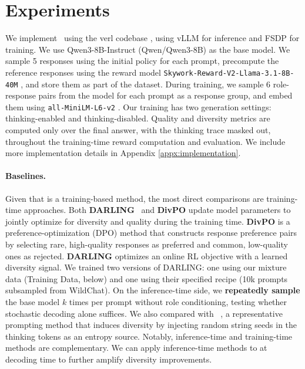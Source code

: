 

\section{Experiments}
\label{sec:experiments}
We implement \method~using the verl codebase \citep{sheng2024hybridflow}, using vLLM \citep{kwon2023efficient} for inference and FSDP \citep{zhao2023pytorch} for training. We use Qwen3-8B-Instruct (Qwen/Qwen3-8B) \citep{yang2025qwen3technicalreport} as the base model. We sample 5 responses using the initial policy for each prompt, precompute the reference responses using the reward model \texttt{Skywork-Reward-V2-Llama-3.1-8B-40M} \citep{liu2025skywork}, and store them as part of the dataset. During training, we sample 6 role-response pairs from the model for each prompt as a response group, and embed them using \texttt{all-MiniLM-L6-v2} \citep{wang2020minilmdeepselfattentiondistillation}. Our training has two generation settings: thinking-enabled and thinking-disabled. Quality and diversity metrics are computed only over the final answer, with the thinking trace masked out, throughout the training-time reward computation and evaluation. We include more implementation details in Appendix \ref{appx:implementation}.

\paragraph{Baselines.}
\label{subsec:baselines}
Given that \method{} is a training-based method, the most direct comparisons are training-time approaches. Both \textbf{DARLING}~\citep{li2025jointlyreinforcingdiversityquality} and \textbf{DivPO} \citep{lanchantin2025diverse} update model parameters to jointly optimize for diversity and quality during the training time. \textbf{DivPO} is a preference-optimization (DPO) method that constructs response preference pairs by selecting rare, high-quality responses as preferred and common, low-quality ones as rejected. \textbf{DARLING} optimizes an online RL objective with a learned diversity signal. We trained two versions of DARLING: one using our mixture data (Training Data, below) and one using their specified recipe (10k prompts subsampled from WildChat). On the inference-time side,  we \textbf{repeatedly sample} the base model $k$ times per prompt without role conditioning, testing whether stochastic decoding alone suffices. We also compared with \textbf{\ssot}~\citep{Misaki2026}, a representative prompting method that induces diversity by injecting random string seeds in the thinking tokens as an entropy source. Notably, inference-time and training-time methods are complementary. We can apply inference-time methods to \method{} at decoding time to further amplify diversity improvements.


